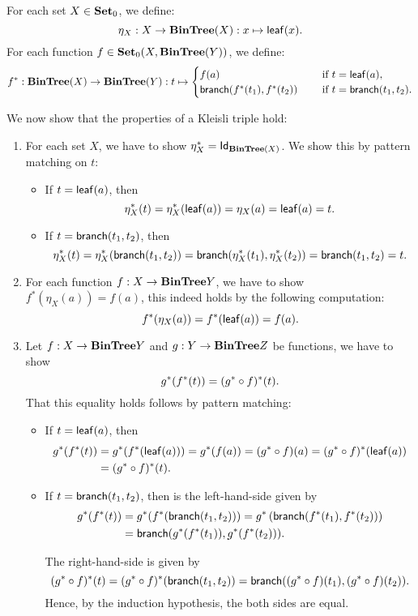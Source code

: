 \begin{solution}
\label{sol:kleisli_triple_bintree}
For each set $X\in\Ob \SET$, we define:
\[
\eta_X : X \to \BinTree(X) : x\mapsto \Leaf x.
\]
For each function $f\in\CHom{\Ob \SET}{X}{\BinTree(Y)}$, we define:
\begin{align*}
f^{*} : \BinTree(X) \to \BinTree(Y) : t \mapsto 
\begin{cases}
f(a) &\quad \text{ if } t=\Leaf a,\\
\Branch{f^{*}(t_1)}{f^{*}(t_2)} &\quad \text{ if } t=\Branch{t_1}{t_2}.
\end{cases}
\end{align*}

We now show that the properties of a Kleisli triple hold:
\begin{enumerate}
\item For each set $X$, we have to show $\eta_X^{*} = \Id[\BinTree(X)]$. We show this by pattern matching on $t$:
\begin{itemize}
\item If $t=\Leaf a$, then
\[
\eta_X^{*}(t) = \eta_X^{*}(\Leaf{a}) = \eta_X(a) = \Leaf{a} = t.
\]
\item If $t=\Branch{t_1}{t_2}$, then
\[
\eta_X^{*}(t) = \eta_X^{*}(\Branch{t_1}{t_2}) = \Branch{\eta_X^{*}(t_1)}{\eta_X^{*}(t_2)} = \Branch{t_1}{t_2} = t.
\]
\end{itemize}

\item For each function $f:X\to \BinTree Y$, we have to show $f^{*}(\eta_X(a)) = f(a)$, this indeed holds by the following computation:
\[
f^{*}(\eta_X(a)) = f^{*}(\Leaf{a}) = f(a).
\]

\item Let $f:X\to \BinTree Y$ and $g:Y\to \BinTree Z$ be functions, we have to show 
\[
g^{*}(f^{*}(t)) = (\co{f}{g^{*}})^{*}(t).
\] 
That this equality holds follows by pattern matching:
\begin{itemize}
\item If $t= \Leaf{a}$, then
\begin{align*}
	g^{*}(f^{*}(t)) & = g^{*}(f^{*}(\Leaf{a})) = g^{*}(f(a)) = (\co{f}{g^{*}})(a) = (\co{f}{g^{*}})^{*}(\Leaf{a}) \\
	& = (\co{f}{g^{*}})^{*}(t).	
\end{align*}

\item If $t=\Branch{t_1}{t_2}$, then is the left-hand-side given by
\begin{align*}
	g^{*}(f^{*}(t)) & = g^{*}(f^{*}(\Branch{t_1}{t_2})) = g^{*}\left(\Branch{f^{*}(t_1)}{f^{*}(t_2)}\right) \\
	& = \Branch{g^{*}(f^{*}(t_1))}{g^{*}(f^{*}(t_2))}.	
\end{align*}

The right-hand-side is given by 
\[
(\co{f}{g^{*}})^{*}(t) = (\co{f}{g^{*}})^{*}(\Branch{t_1}{t_2}) = \Branch{(\co{f}{g^{*}})(t_1)}{(\co{f}{g^{*}})(t_2)}.
\]
Hence, by the induction hypothesis, the both sides are equal.
\end{itemize}

\end{enumerate}
\end{solution}

